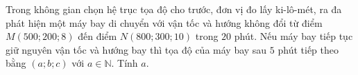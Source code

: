 \begin{bt}%
	Trong không gian chọn hệ trục tọa độ cho trước, đơn vị đo lấy ki-lô-mét, ra đa phát hiện một máy bay di chuyển với vận tốc và hướng  không đổi từ điểm $M(500;200;8)$ đến điểm $N(800;300;10)$ trong $20$ phút. Nếu máy bay tiếp tục giữ nguyên vận tốc và hướng bay thì tọa độ của máy bay sau $5$ phút tiếp theo bằng $(a;b;c)$ với $a\in \mathbb{N}$. Tính $a$.
\end{bt}

